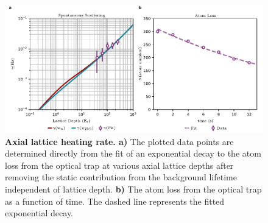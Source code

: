 \begin{figure}[t!]
		\includegraphics[width=\columnwidth]{figures/ch2/heating_rates/ScatteringRatesCalv2v2edit.pdf} 
		\caption{\textbf{Axial lattice heating rate. a)} The plotted data points are determined directly from the fit of an exponential decay to the atom loss from the optical trap at various axial lattice depths after removing the static contribution from the background lifetime independent of lattice depth. \textbf{b)} The atom loss from the optical trap as a function of time. The dashed line represents the fitted exponential decay.}
		\label{fig:heatingCal}	
\end{figure}




